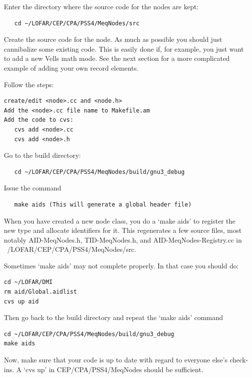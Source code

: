 \documentclass[10pt]{article}
\begin{document}
Enter the directory where the source code for the nodes are kept:

\begin{verbatim}
   cd ~/LOFAR/CEP/CPA/PSS4/MeqNodes/src
\end{verbatim}

Create the source code for the node. As much as possible
you should just cannibalize some existing code. This is easily done
if, for example, you just want to add a new Vells math mode.
See the next section for a more complicated example of adding
your own record elements.

Follow the steps:

\begin{verbatim}
create/edit <node>.cc and <node.h>
Add the <node>.cc file name to Makefile.am
Add the code to cvs:
   cvs add <node>.cc
   cvs add <node>.h
\end{verbatim}

Go to the build directory:
\begin{verbatim}
   cd ~/LOFAR/CEP/CPA/PSS4/MeqNodes/build/gnu3_debug
\end{verbatim}

Issue the command

\begin{verbatim}
   make aids (This will generate a global header file)
\end{verbatim}

When you have created a new node class, you do a `make aids' to 
register the new type and allocate identifiers for
it. This regenerates a few source files, most notably
AID-MeqNodes.h, TID-MeqNodes.h, and AID-MeqNodes-Registry.cc 
in ~/LOFAR/CEP/CPA/PSS4/MeqNodes/src. 

Sometimes `make aids' may not complete properly. In that case you
should do:

\begin{verbatim}
cd ~/LOFAR/DMI
rm aid/Global.aidlist
cvs up aid
\end{verbatim}

Then go back to the build directory and repeat the `make aids' command

\begin{verbatim}
cd ~/LOFAR/CEP/CPA/PSS4/MeqNodes/build/gnu3_debug
make aids
\end{verbatim}

Now, make sure that your code is up to date with regard to everyone 
else's check-ins.  A `cvs up' in CEP/CPA/PSS4/MeqNodes should be sufficient.
                                                                                
\end{document}
